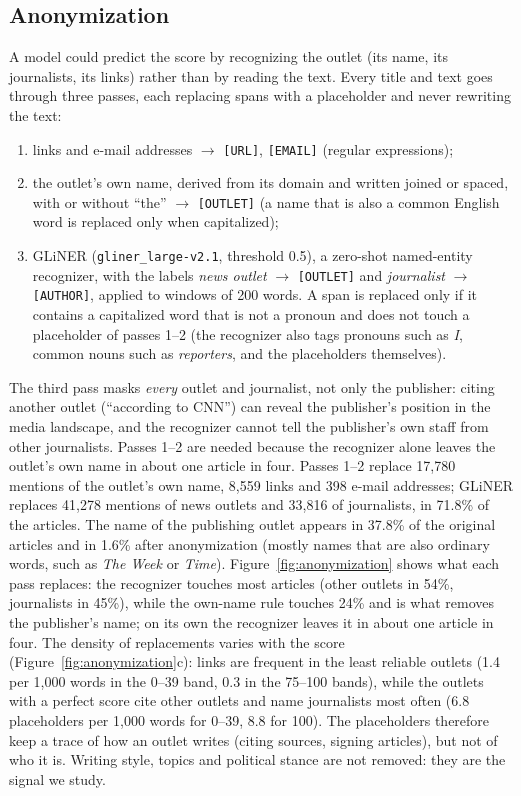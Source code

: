 \documentclass[11pt,a4paper]{article}
\begin{document}
\subsection{Anonymization}\label{sec:anon}
A model could predict the score by recognizing the outlet (its name, its journalists, its links) rather than by
reading the text. Every title and text goes through three passes, each replacing spans with a placeholder and never
rewriting the text:
\begin{enumerate}
  \item links and e-mail addresses $\rightarrow$ \texttt{[URL]}, \texttt{[EMAIL]} (regular expressions);
  \item the outlet's own name, derived from its domain and written joined or spaced, with or without ``the''
        $\rightarrow$ \texttt{[OUTLET]} (a name that is also a common English word is replaced only when
        capitalized);
  \item GLiNER \citep{zaratiana2024gliner} (\texttt{gliner\_large-v2.1}, threshold 0.5), a zero-shot named-entity
        recognizer, with the labels \emph{news outlet} $\rightarrow$ \texttt{[OUTLET]} and \emph{journalist}
        $\rightarrow$ \texttt{[AUTHOR]}, applied to windows of 200 words. A span is replaced only if it contains a
        capitalized word that is not a pronoun and does not touch a placeholder of passes 1--2 (the recognizer also
        tags pronouns such as \emph{I}, common nouns such as \emph{reporters}, and the placeholders themselves).
\end{enumerate}
The third pass masks \emph{every} outlet and journalist, not only the publisher: citing another outlet (``according to
CNN'') can reveal the publisher's position in the media landscape, and the recognizer cannot tell the publisher's own
staff from other journalists. Passes 1--2 are needed because the recognizer alone leaves the outlet's own name in
about one article in four. Passes 1--2 replace 17,780 mentions of the outlet's own name, 8,559 links and 398 e-mail
addresses; GLiNER replaces 41,278 mentions of news outlets and 33,816 of journalists, in 71.8\% of the articles. The
name of the publishing outlet appears in 37.8\% of the original articles and in 1.6\% after anonymization (mostly
names that are also ordinary words, such as \emph{The Week} or \emph{Time}). Figure~\ref{fig:anonymization} shows
what each pass replaces: the recognizer touches most articles (other outlets in 54\%, journalists in 45\%), while the
own-name rule touches 24\% and is what removes the publisher's name; on its own the recognizer leaves it in about
one article in four. The density of replacements varies with the score (Figure~\ref{fig:anonymization}c): links are
frequent in the least reliable outlets (1.4 per 1,000 words in the 0--39 band, 0.3 in the 75--100 bands), while the
outlets with a perfect score cite other outlets and name journalists most often (6.8 placeholders per 1,000 words for
0--39, 8.8 for 100). The placeholders therefore keep a trace of how an outlet writes (citing sources, signing
articles), but not of who it is. Writing style, topics and political stance are not removed: they are the signal we
study.
\end{document}
